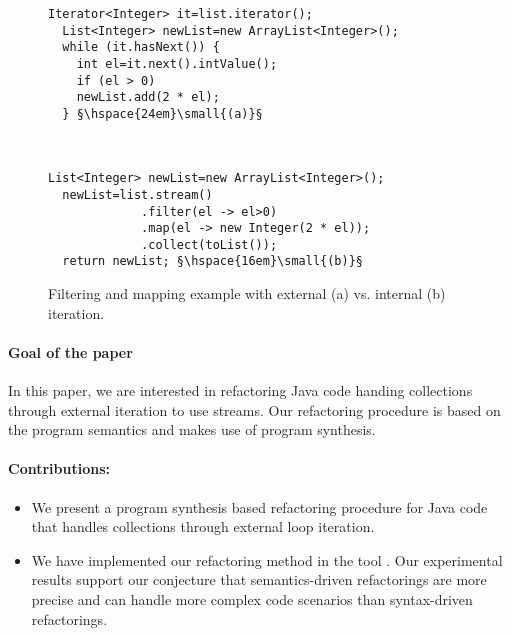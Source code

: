 \documentclass[runningheads,a4paper]{llncs}
\begin{document}
\begin{figure*}
\begin{minipage}{\textwidth}
  \begin{lstlisting}[mathescape=true,escapechar={§}]
  Iterator<Integer> it=list.iterator();
  List<Integer> newList=new ArrayList<Integer>();
  while (it.hasNext()) {
    int el=it.next().intValue();
    if (el > 0)
	newList.add(2 * el);
  } §\hspace{24em}\small{(a)}§
\end{lstlisting}
\end{minipage}\\
\begin{minipage}{\textwidth}
  \begin{lstlisting}[mathescape=true,escapechar={§}]
  List<Integer> newList=new ArrayList<Integer>();
  newList=list.stream()
             .filter(el -> el>0)
             .map(el -> new Integer(2 * el));
             .collect(toList());
  return newList; §\hspace{16em}\small{(b)}§
\end{lstlisting}
\end{minipage}
\caption{Filtering and mapping example with external (a) vs. internal (b) iteration.}
\label{ex:stream}
\end{figure*}

\paragraph{Goal of the paper} 
In this paper, we are interested in refactoring Java code handing
collections through external iteration to use streams. Our refactoring
procedure is based on the program semantics and makes use of program
synthesis.

\paragraph{Contributions:}
%
\begin{itemize}
%
\item We present a program synthesis based refactoring procedure for Java
code that handles collections through external loop iteration.
%
%
\item We have implemented our refactoring method in the tool \tool. Our
experimental results support our conjecture that semantics-driven
refactorings are more precise and can handle more complex code scenarios
than syntax-driven refactorings.
%
\end{itemize}
\end{document}
